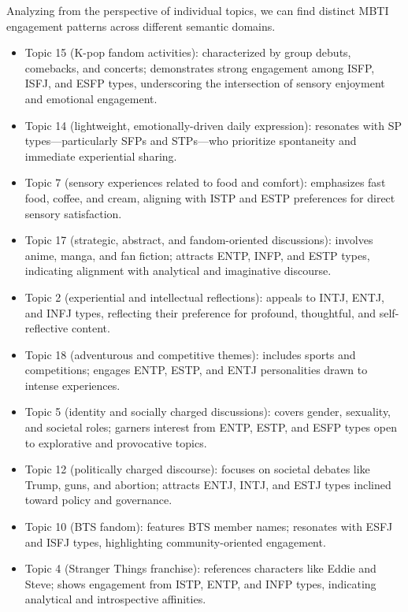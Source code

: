 \documentclass[12pt]{article}
\begin{document}
	 
	
	Analyzing from the perspective of individual topics, we can find distinct MBTI engagement patterns across different semantic domains. 
	\begin{itemize}
	\item Topic 15 (K-pop fandom activities): characterized by group debuts, comebacks, and concerts; demonstrates strong engagement among ISFP, ISFJ, and ESFP types, underscoring the intersection of sensory enjoyment and emotional engagement.
	\item Topic 14 (lightweight, emotionally-driven daily expression): resonates with SP types—particularly SFPs and STPs—who prioritize spontaneity and immediate experiential sharing.
	\item Topic 7 (sensory experiences related to food and comfort): emphasizes fast food, coffee, and cream, aligning with ISTP and ESTP preferences for direct sensory satisfaction.
	\item Topic 17 (strategic, abstract, and fandom-oriented discussions): involves anime, manga, and fan fiction; attracts ENTP, INFP, and ESTP types, indicating alignment with analytical and imaginative discourse.
	\item Topic 2 (experiential and intellectual reflections): appeals to INTJ, ENTJ, and INFJ types, reflecting their preference for profound, thoughtful, and self-reflective content.
	\item Topic 18 (adventurous and competitive themes): includes sports and competitions; engages ENTP, ESTP, and ENTJ personalities drawn to intense experiences.
	\item Topic 5 (identity and socially charged discussions): covers gender, sexuality, and societal roles; garners interest from ENTP, ESTP, and ESFP types open to explorative and provocative topics.
	\item Topic 12 (politically charged discourse): focuses on societal debates like Trump, guns, and abortion; attracts ENTJ, INTJ, and ESTJ types inclined toward policy and governance.
	\item Topic 10 (BTS fandom): features BTS member names; resonates with ESFJ and ISFJ types, highlighting community-oriented engagement.
	\item Topic 4 (Stranger Things franchise): references characters like Eddie and Steve; shows engagement from ISTP, ENTP, and INFP types, indicating analytical and introspective affinities.
	\end{itemize}
	
\end{document}
